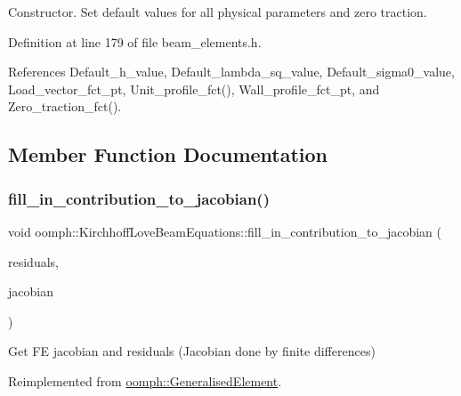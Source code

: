 Constructor. Set default values for all physical parameters and zero traction. 



Definition at line 179 of file beam\+\_\+elements.\+h.



References Default\+\_\+h\+\_\+value, Default\+\_\+lambda\+\_\+sq\+\_\+value, Default\+\_\+sigma0\+\_\+value, Load\+\_\+vector\+\_\+fct\+\_\+pt, Unit\+\_\+profile\+\_\+fct(), Wall\+\_\+profile\+\_\+fct\+\_\+pt, and Zero\+\_\+traction\+\_\+fct().



\subsection{Member Function Documentation}
\mbox{\label{classoomph_1_1KirchhoffLoveBeamEquations_af335ab12a9b5e870f25516a53b2a7b60}} 
\subsubsection{\texorpdfstring{fill\+\_\+in\+\_\+contribution\+\_\+to\+\_\+jacobian()}{fill\_in\_contribution\_to\_jacobian()}}
{\footnotesize\ttfamily void oomph\+::\+Kirchhoff\+Love\+Beam\+Equations\+::fill\+\_\+in\+\_\+contribution\+\_\+to\+\_\+jacobian (\begin{DoxyParamCaption}\item[{\hyperlink{classoomph_1_1Vector}{Vector}$<$ double $>$ \&}]{residuals,  }\item[{\hyperlink{classoomph_1_1DenseMatrix}{Dense\+Matrix}$<$ double $>$ \&}]{jacobian }\end{DoxyParamCaption})\hspace{0.3cm}{\ttfamily [virtual]}}



Get FE jacobian and residuals (Jacobian done by finite differences) 



Reimplemented from \hyperlink{classoomph_1_1GeneralisedElement_a6ae09fc0d68e4309ac1b03583d252845}{oomph\+::\+Generalised\+Element}.



